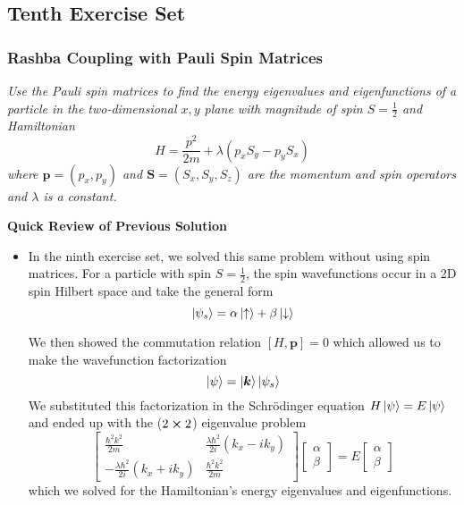 \documentclass[11pt, a4paper]{article}
\newcommand{\schro}{Schr\"{o}dinger\xspace}
\renewcommand{\vec}[1]{\bm{#1}} %
\newcommand{\ua}{\uparrow}  %
\newcommand{\da}{\downarrow}  %
\begin{document}
\subsection{Tenth Exercise Set}

\subsubsection{Rashba Coupling with Pauli Spin Matrices}
\textit{Use the Pauli spin matrices to find the energy eigenvalues and eigenfunctions of a particle in the two-dimensional $ x, y $ plane with magnitude of spin $ S = \frac{1}{2} $ and Hamiltonian}
\begin{equation*}
	H = \frac{p^{2}}{2m} + \lambda (p_{x}S_{y} - p_{y}S_{x})
\end{equation*}
\textit{where $ \vec{p} = (p_{x}, p_{y}) $ and $ \vec{S} = (S_{x}, S_{y}, S_{z}) $ are the momentum and spin operators and $ \lambda $ is a constant.}


\vspace{2mm}
\textbf{Quick Review of Previous Solution}
\begin{itemize}
	\item In the ninth exercise set, we solved this same problem without using spin matrices. For a particle with spin $ S = \frac{1}{2} $, the spin wavefunctions occur in a 2D spin Hilbert space and take the general form
	\begin{equation*}
		\ket{\psi_{s}} = \alpha \ket{\ua} + \beta \ket{\da}
	\end{equation*}
	
	We then showed the commutation relation $ [H, \vec{p}] = 0 $ which allowed us to make the wavefunction factorization
	\begin{equation*}
		\ket{\psi} = \ket{\vec{k}}\ket{\psi_{s}}
	\end{equation*}
	We substituted this factorization in the \schro equation $ H \ket{\psi} = E \ket{\psi} $ and ended up with the ($ 2 \cross 2 $) eigenvalue problem
	\begin{equation*}
		\begin{bmatrix}
		\frac{\hbar^{2}k^{2}}{2m} & \frac{\lambda \hbar^{2}}{2i}(k_{x}-ik_{y}) \\
		-\frac{\lambda \hbar^{2}}{2i}(k_{x}+ik_{y}) & \frac{\hbar^{2}k^{2}}{2m}
		\end{bmatrix}
		\begin{bmatrix}
			\alpha\\
			\beta
		\end{bmatrix}
		= E
		\begin{bmatrix}
			\alpha\\
			\beta
		\end{bmatrix}
	\end{equation*}
	which we solved for the Hamiltonian's energy eigenvalues and eigenfunctions.
\end{itemize}
\end{document}
